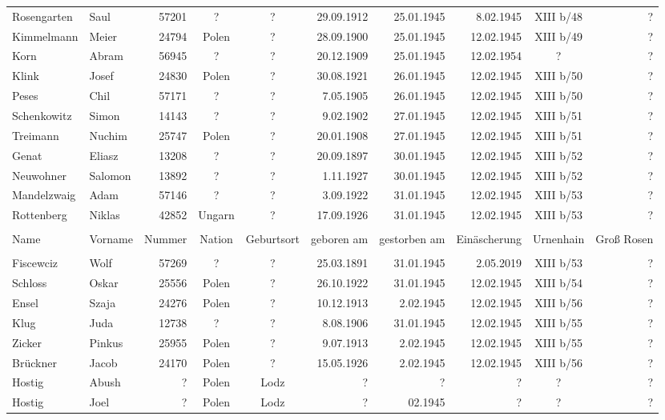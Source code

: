 \begin{tiny}
\begin{longtable}[l]{|l|l|r|c|c|r|r|r|c|r|}
Rosengarten  &  Saul  & 57201 &  ?  &  ?  & 29.09.1912 & 25.01.1945 & 8.02.1945 &  XIII b/48  &  ? \\[3pt]
Kimmelmann  &  Meier  & 24794 &  Polen  &  ?  & 28.09.1900 & 25.01.1945 & 12.02.1945 &  XIII b/49  &  ? \\[3pt]
Korn  &  Abram  & 56945 &  ?  &  ?  & 20.12.1909 & 25.01.1945 & 12.02.1954 &  ?  &  ? \\[3pt]
Klink  &  Josef  & 24830 &  Polen  &  ?  & 30.08.1921 & 26.01.1945 & 12.02.1945 &  XIII b/50  &  ? \\[3pt]
Peses  &  Chil  & 57171 &  ?  &  ?  & 7.05.1905 & 26.01.1945 & 12.02.1945 &  XIII b/50  &  ? \\[3pt]
Schenkowitz  &  Simon  & 14143 &  ?  &  ?  & 9.02.1902 & 27.01.1945 & 12.02.1945 &  XIII b/51  &  ? \\[3pt]
Treimann  &  Nuchim  & 25747 &  Polen  &  ?  & 20.01.1908 & 27.01.1945 & 12.02.1945 &  XIII b/51  &  ? \\[3pt]
Genat  &  Eliasz  & 13208 &  ?  &  ?  & 20.09.1897 & 30.01.1945 & 12.02.1945 &  XIII b/52  &  ? \\[3pt]
Neuwohner  &  Salomon  & 13892 &  ?  &  ?  & 1.11.1927 & 30.01.1945 & 12.02.1945 &  XIII b/52  &  ? \\[3pt]
Mandelzwaig  &  Adam  & 57146 &  ?  &  ?  & 3.09.1922 & 31.01.1945 & 12.02.1945 &  XIII b/53  &  ? \\[3pt]
Rottenberg  &  Niklas  & 42852 &  Ungarn  &  ?  & 17.09.1926 & 31.01.1945 & 12.02.1945 &  XIII b/53  &  ? \\[3pt]

\hline\pagebreak\hline  & \\[-9pt]
Name  &  Vorname  &  Nummer  &  Nation  &  Geburtsort  &  geboren am  &  gestorben am  &  Einäscherung  &  Urnenhain  &  Groß Rosen \\[3pt]
\hline  & \\[-9pt]

Fiscewciz  &  Wolf  & 57269 &  ?  &  ?  & 25.03.1891 & 31.01.1945 & 2.05.2019 &  XIII b/53  &  ? \\[3pt]
Schloss  &  Oskar  & 25556 &  Polen  &  ?  & 26.10.1922 & 31.01.1945 & 12.02.1945 &  XIII b/54  &  ? \\[3pt]
Ensel  &  Szaja  & 24276 &  Polen  &  ?  & 10.12.1913 & 2.02.1945 & 12.02.1945 &  XIII b/56  &  ? \\[3pt]
Klug  &  Juda  & 12738 &  ?  &  ?  & 8.08.1906 & 31.01.1945 & 12.02.1945 &  XIII b/55  &  ? \\[3pt]
Zicker  &  Pinkus  & 25955 &  Polen  &  ?  & 9.07.1913 & 2.02.1945 & 12.02.1945 &  XIII b/55  &  ? \\[3pt]
Brückner  &  Jacob  & 24170 &  Polen  &  ?  			& 15.05.1926 	& 2.02.1945 & 12.02.1945 &  XIII b/56  &  ? \\[3pt]
Hostig  &  Abush  &  ?  		&  Polen  &  Lodz 	 &  ?  					& ?  				& ?  				&  ? & ?\\[3pt] 
Hostig  &  Joel  &  ?  			&  Polen  &  Lodz 	 &  ?  &  02.1945 	 & ?  &  ? & ?\\
\hline
\end{longtable}
\end{tiny}


